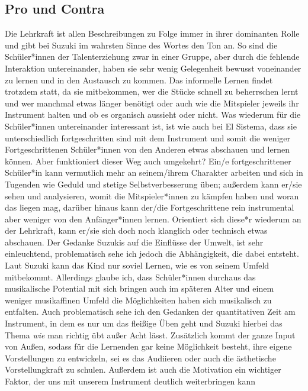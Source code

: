 \subsection{Pro und Contra}

Die Lehrkraft ist allen Beschreibungen zu Folge immer in ihrer dominanten Rolle
und gibt bei Suzuki im wahrsten Sinne des Wortes den Ton an. So sind die
Schüler*innen der Talenterziehung zwar in einer Gruppe, aber durch die fehlende
Interaktion untereinander, haben sie sehr wenig Gelegenheit bewusst voneinander
zu lernen und in den Austausch zu kommen. Das informelle Lernen findet
trotzdem statt, da sie mitbekommen, wer die Stücke schnell zu beherrschen lernt
und wer manchmal etwas länger benötigt oder auch wie die Mitspieler jeweils ihr
Instrument halten und ob es organisch aussieht oder nicht. Was wiederum für die
Schüler*innen untereinander interessant ist, ist wie auch bei El Sistema, dass
sie unterschiedlich fortgeschritten sind mit dem Instrument und somit die
weniger Fortgeschrittenen Schüler*innen von den Anderen etwas abschauen und
lernen können. Aber funktioniert dieser Weg auch umgekehrt? Ein/e
fortgeschrittener Schüler*in kann vermutlich mehr an seinem/ihrem Charakter
arbeiten und sich in Tugenden wie Geduld und stetige Selbstverbesserung üben;
außerdem kann er/sie sehen und analysieren, womit die Mitspieler*innen zu
kämpfen haben und woran das liegen mag, darüber hinaus kann der/die
Fortgeschrittene rein instrumental aber weniger von den Anfänger*innen lernen.
Orientiert sich diese*r wiederum an der Lehrkraft, kann er/sie sich doch noch
klanglich oder technisch etwas abschauen. Der Gedanke Suzukis auf die Einflüsse
der Umwelt, ist sehr einleuchtend, problematisch sehe ich jedoch die
Abhängigkeit, die dabei entsteht. Laut Suzuki kann das Kind nur soviel Lernen,
wie es von seinem Umfeld mitbekommt. Allerdings glaube ich, dass Schüler*innen
durchaus das musikalische Potential mit sich bringen auch im späteren Alter und
einem weniger musikaffinen Umfeld die Möglichkeiten haben sich musikalisch zu
entfalten. Auch problematisch sehe ich den Gedanken der quantitativen Zeit am
Instrument, in dem es nur um das fleißige Üben geht und Suzuki hierbei das Thema
\emph{wie} man richtig übt außer Acht lässt. Zusätzlich kommt der ganze Input
von Außen, sodass für die Lernenden gar keine Möglichkeit besteht, ihre eigene
Vorstellungen zu entwickeln, sei es das Audiieren oder auch die
ästhetische Vorstellungkraft zu schulen. Außerdem ist auch die Motivation
ein wichtiger Faktor, der uns mit unserem Instrument deutlich weiterbringen kann
